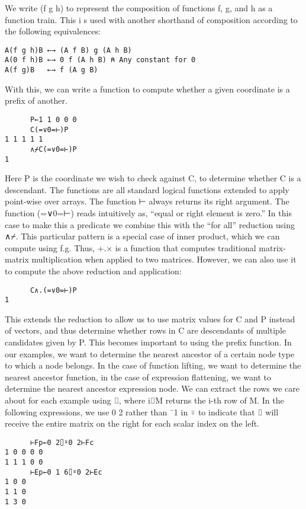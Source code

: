 \documentclass[pldi]{sigplanconf-pldi15}
\begin{document}
We write (f g h) to represent the composition of functions f, g, and h as a function train. This i
s used with another shorthand of composition according to the following equivalences:

\begin{verbatim}
A(f g h)B ←→ (A f B) g (A h B)
A(0 f h)B ←→ 0 f (A h B) ⍝ Any constant for 0
A(f g)B   ←→ f (A g B)
\end{verbatim}

With this, we can write a function to compute whether a given coordinate is a prefix of another.

\begin{verbatim}
      P←1 1 0 0 0
      C(=∨0=⊢)P
1 1 1 1 1
      ∧⌿C(=∨0=⊢)P
1
\end{verbatim}

Here P is the coordinate we wish to check against C, to determine whether C is a descendant. The
 functions are all standard logical functions extended to apply point-wise over arrays. The 
 function ⊢ always returns its right argument. The function (=∨0=⊢) reads intuitively as, “equal or 
 right element is zero.” In this case to make this a predicate we combine this with the “for all” 
 reduction using ∧⌿. This particular pattern is a special case of inner product, which we can compute 
 using f.g. Thus, +.× is a function that computes traditional matrix-matrix multiplication when applied 
 to two matrices. However, we can also use it to compute the above reduction and application:
 
\begin{verbatim}
      C∧.(=∨0=⊢)P
1
\end{verbatim}

This extends the reduction to allow us to use matrix values for C and P instead of vectors, and thus 
determine whether rows in C are descendants of multiple candidates given by P. This becomes important 
to using the prefix function. In our examples, we want to determine the nearest ancestor of a certain 
node type to which a node belongs. In the case of function lifting, we want to determine the nearest 
ancestor function, in the case of expression flattening, we want to determine the nearest ancestor 
expression node. We can extract the rows we care about for each example using ⌷, where i⌷M returns 
the i-th row of M. In the following expressions, we use 0 2 rather than ¯1 in ⍤ to indicate that ⌷ will 
receive the entire matrix on the right for each scalar index on the left.

\begin{verbatim}
      ⊢Fp←0 2⌷⍤0 2⊢Fc
1 0 0 0 0
1 1 1 0 0
      ⊢Ep←0 1 6⌷⍤0 2⊢Ec
1 0 0
1 1 0
1 3 0
\end{verbatim}
\end{document}
